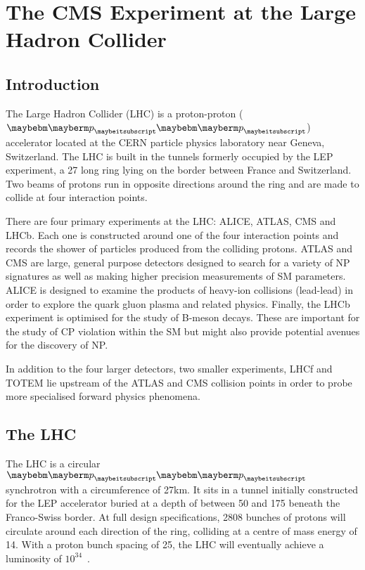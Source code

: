 \chapter{The CMS Experiment at the Large Hadron Collider}
\section{Introduction}
The Large Hadron Collider (LHC) is a proton-proton ($\Pp\Pp$) accelerator
located at the CERN particle physics laboratory near Geneva, Switzerland. The
LHC is built in the tunnels formerly occupied by the LEP experiment, a
\unit{27}{\kilo\metre} long ring lying on the border between France and Switzerland. Two
beams of protons run in opposite directions around the ring and are made to
collide at four interaction points.

There are four primary experiments at the LHC: \ac{ALICE}, \ac{ATLAS}, \ac{CMS}
and \ac{LHCb}. Each one is constructed around one of the four interaction points
and records the shower of particles produced from the colliding protons. ATLAS
and CMS are large, general purpose detectors designed to search for a variety of
\ac{NP} signatures as well as making higher precision measurements of \ac{SM}
parameters. \ac{ALICE} is designed to examine the products of heavy-ion
collisions (lead-lead) in order to explore the quark gluon plasma and related
physics. Finally, the \ac{LHCb} experiment is optimised for the study of B-meson
decays. These are important for the study of CP violation within the \ac{SM} but
might also provide potential avenues for the discovery of \ac{NP}.

In addition to the four larger detectors, two smaller experiments, \ac{LHCf} and
\ac{TOTEM} lie upstream of the \ac{ATLAS} and \ac{CMS} collision points in order
to probe more specialised forward physics phenomena.

\section{The \acl{LHC}}
The \ac{LHC} is a circular $\Pp\Pp$ synchrotron with a circumference of
\unit{27}{km}. It sits in a tunnel initially constructed for the \ac{LEP}
accelerator buried at a depth of between 50 and \unit{175}{\metre} beneath the
Franco-Swiss border. At full design specifications, 2808 bunches of protons will
circulate around each direction of the ring, colliding at a centre of mass
energy of \unit{14}{\TeV}. With a proton bunch spacing of
\unit{25}{\ns}, the \ac{LHC} will eventually achieve a luminosity of
\unit{$10^{34}$}{\rpsquare{\centi\metre}\usk\reciprocal\second}.

